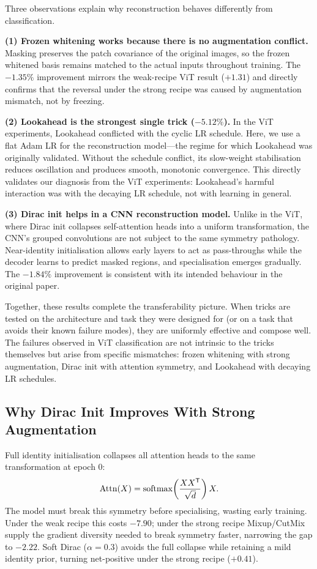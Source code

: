 Three observations explain why reconstruction behaves differently from classification.

\textbf{(1) Frozen whitening works because there is no augmentation conflict.}
Masking preserves the patch covariance of the original images, so the frozen whitened basis remains matched to the actual inputs throughout training.
The $-1.35\%$ improvement mirrors the weak-recipe ViT result ($+1.31$\pp{}) and directly confirms that the reversal under the strong recipe was caused by augmentation mismatch, not by freezing.

\textbf{(2) Lookahead is the strongest single trick ($-5.12\%$).}
In the ViT experiments, Lookahead conflicted with the cyclic LR schedule.
Here, we use a flat Adam LR for the reconstruction model---the regime for which Lookahead was originally validated.
Without the schedule conflict, its slow-weight stabilisation reduces oscillation and produces smooth, monotonic convergence.
This directly validates our diagnosis from the ViT experiments: Lookahead's harmful interaction was with the decaying LR schedule, not with learning in general.

\textbf{(3) Dirac init helps in a CNN reconstruction model.}
Unlike in the ViT, where Dirac init collapses self-attention heads into a uniform transformation, the CNN's grouped convolutions are not subject to the same symmetry pathology.
Near-identity initialisation allows early layers to act as pass-throughs while the decoder learns to predict masked regions, and specialisation emerges gradually.
The $-1.84\%$ improvement is consistent with its intended behaviour in the original paper.

Together, these results complete the transferability picture.
When tricks are tested on the architecture and task they were designed for (or on a task that avoids their known failure modes), they are uniformly effective and compose well.
The failures observed in ViT classification are not intrinsic to the tricks themselves but arise from specific mismatches: frozen whitening with strong augmentation, Dirac init with attention symmetry, and Lookahead with decaying LR schedules.

\subsection{Why Dirac Init Improves With Strong Augmentation}

Full identity initialisation collapses all attention heads to the same transformation at epoch 0:
\begin{equation}
    \operatorname{Attn}(X) =
    \operatorname{softmax} \!\left(
    \frac{XX^{\mathsf{T}}}{\sqrt{d}}
    \right) X.
\end{equation}
The model must break this symmetry before specialising, wasting early training.
Under the weak recipe this costs $-7.90$\pp{}; under the strong recipe Mixup/CutMix supply the gradient diversity needed to break symmetry faster, narrowing the gap to $-2.22$\pp{}.
Soft Dirac ($\alpha=0.3$) avoids the full collapse while retaining a mild identity prior, turning net-positive under the strong recipe ($+0.41$\pp{}).

